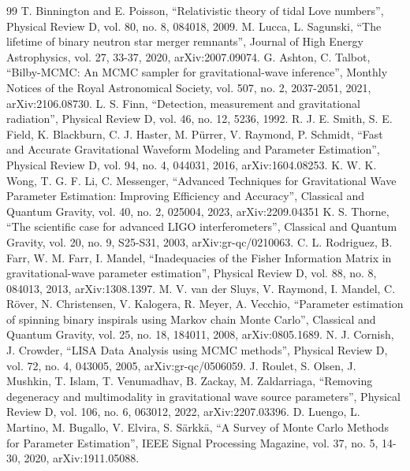 \documentclass[12pt]{article}
\begin{document}
\begin{thebibliography}{99}
  T. Binnington and E. Poisson,
  ``Relativistic theory of tidal Love numbers'',
  Physical Review D, vol. 80, no. 8, 084018, 2009.
  M. Lucca, L. Sagunski,
  ``The lifetime of binary neutron star merger remnants'',
  Journal of High Energy Astrophysics, vol. 27, 33-37, 2020,
  arXiv:2007.09074.
  G. Ashton, C. Talbot,
  ``Bilby-MCMC: An MCMC sampler for gravitational-wave inference'',
  Monthly Notices of the Royal Astronomical Society, vol. 507, no. 2, 2037-2051, 2021,
  arXiv:2106.08730.
  L. S. Finn,
  ``Detection, measurement and gravitational radiation'',
  Physical Review D, vol. 46, no. 12, 5236, 1992.
  R. J. E. Smith, S. E. Field, K. Blackburn, C. J. Haster, M. Pürrer, V. Raymond, P. Schmidt,
  ``Fast and Accurate Gravitational Waveform Modeling and Parameter Estimation'',
  Physical Review D, vol. 94, no. 4, 044031, 2016,
  arXiv:1604.08253.
  K. W. K. Wong, T. G. F. Li, C. Messenger,
  ``Advanced Techniques for Gravitational Wave Parameter Estimation: Improving Efficiency and Accuracy'',
  Classical and Quantum Gravity, vol. 40, no. 2, 025004, 2023,
  arXiv:2209.04351
  K. S. Thorne,
  ``The scientific case for advanced LIGO interferometers'',
  Classical and Quantum Gravity, vol. 20, no. 9, S25-S31, 2003,
  arXiv:gr-qc/0210063.
  C. L. Rodriguez, B. Farr, W. M. Farr, I. Mandel,
  ``Inadequacies of the Fisher Information Matrix in gravitational-wave parameter estimation'',
  Physical Review D, vol. 88, no. 8, 084013, 2013,
  arXiv:1308.1397.
  M. V. van der Sluys, V. Raymond, I. Mandel, C. Röver, N. Christensen, V. Kalogera, R. Meyer, A. Vecchio,
  ``Parameter estimation of spinning binary inspirals using Markov chain Monte Carlo'',
  Classical and Quantum Gravity, vol. 25, no. 18, 184011, 2008,
  arXiv:0805.1689.
  N. J. Cornish, J. Crowder,
  ``LISA Data Analysis using MCMC methods'',
  Physical Review D, vol. 72, no. 4, 043005, 2005,
  arXiv:gr-qc/0506059.
  J. Roulet, S. Olsen, J. Mushkin, T. Islam, T. Venumadhav, B. Zackay, M. Zaldarriaga,
  ``Removing degeneracy and multimodality in gravitational wave source parameters'',
  Physical Review D, vol. 106, no. 6, 063012, 2022,
  arXiv:2207.03396.
  D. Luengo, L. Martino, M. Bugallo, V. Elvira, S. Särkkä,
  ``A Survey of Monte Carlo Methods for Parameter Estimation'',
  IEEE Signal Processing Magazine, vol. 37, no. 5, 14-30, 2020,
  arXiv:1911.05088.


\end{thebibliography}
\end{document}

